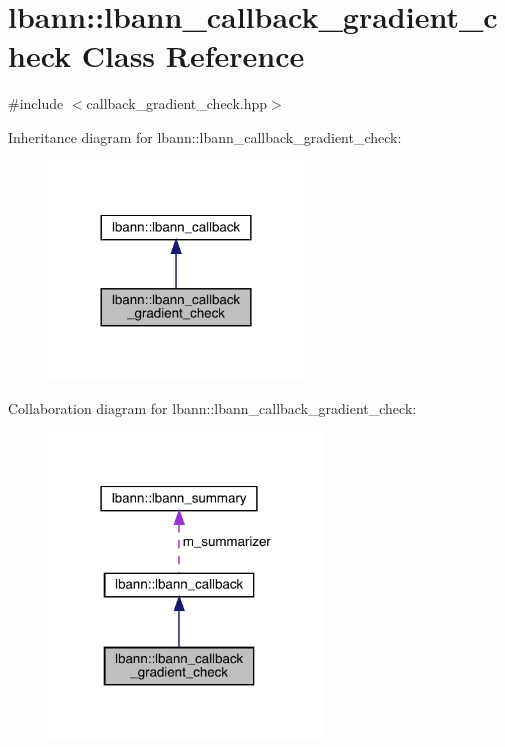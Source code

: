 \hypertarget{classlbann_1_1lbann__callback__gradient__check}{}\section{lbann\+:\+:lbann\+\_\+callback\+\_\+gradient\+\_\+check Class Reference}
\label{classlbann_1_1lbann__callback__gradient__check}


{\ttfamily \#include $<$callback\+\_\+gradient\+\_\+check.\+hpp$>$}



Inheritance diagram for lbann\+:\+:lbann\+\_\+callback\+\_\+gradient\+\_\+check\+:\nopagebreak
\begin{figure}[H]
\begin{center}
\leavevmode
\includegraphics[width=192pt]{classlbann_1_1lbann__callback__gradient__check__inherit__graph}
\end{center}
\end{figure}


Collaboration diagram for lbann\+:\+:lbann\+\_\+callback\+\_\+gradient\+\_\+check\+:\nopagebreak
\begin{figure}[H]
\begin{center}
\leavevmode
\includegraphics[width=207pt]{classlbann_1_1lbann__callback__gradient__check__coll__graph}
\end{center}
\end{figure}
